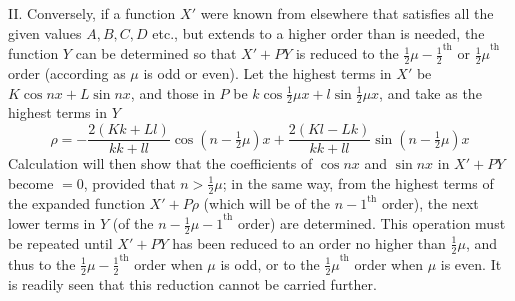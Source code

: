 II. Conversely, if a function \(X'\) were known from elsewhere that satisfies all the given values \(A,B,C,D\) etc., but extends to a higher order than is needed, the function \(Y\) can be determined so that \(X'+PY\) is reduced to the \({\frac{1}{2}\mu-\frac{1}{2}}^{\mathrm{th}}\) or \({\frac{1}{2}\mu}^{\mathrm{th}}\) order (according as \(\mu\) is odd or even). Let the highest terms in \(X'\) be \(K\cos nx+L\sin nx\), and those in \(P\) be \(k\cos\frac{1}{2}\mu x+l\sin\frac{1}{2}\mu x\), and take as the highest terms in \(Y\)
\[
\rho=-\frac{2(Kk+Ll)}{kk+ll}\cos(n-\tfrac{1}{2}\mu)x
     +\frac{2(Kl-Lk)}{kk+ll}\sin(n-\tfrac{1}{2}\mu)x
\]
Calculation will then show that the coefficients of \(\cos nx\) and \(\sin nx\) in \(X'+PY\) become \(=0\), provided that \(n>\frac{1}{2}\mu\); in the same way, from the highest terms of the expanded function \(X'+P\rho\) (which will be of the \({n-1}^{\mathrm{th}}\) order), the next lower terms in \(Y\) (of the \({n-\frac{1}{2}\mu-1}^{\mathrm{th}}\) order) are determined. This operation must be repeated until \(X'+PY\) has been reduced to an order no higher than \(\frac{1}{2}\mu\), and thus to the \({\frac{1}{2}\mu-\frac{1}{2}}^{\mathrm{th}}\) order when \(\mu\) is odd, or to the \({\frac{1}{2}\mu}^{\mathrm{th}}\) order when \(\mu\) is even. It is readily seen that this reduction cannot be carried further.

